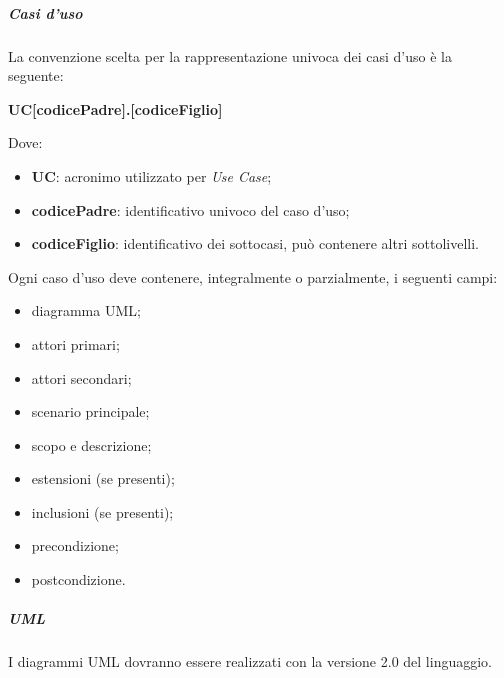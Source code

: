 				\subparagraph{Casi d'uso}
				La convenzione scelta per la rappresentazione univoca dei casi d'uso è la seguente:
				\begin{center}
					\textbf{UC[codicePadre].[codiceFiglio]}
				\end{center}					
				Dove:
				\begin{itemize}
					\item \textbf{UC}: acronimo utilizzato per \textit{Use Case};
					\item \textbf{codicePadre}: identificativo univoco del caso d'uso;
					\item \textbf{codiceFiglio}: identificativo dei sottocasi, può contenere altri sottolivelli.
				\end{itemize}
				Ogni caso d'uso deve contenere, integralmente o parzialmente, i seguenti campi:
				\begin{itemize}
					\item diagramma UML;
					\item attori primari;
					\item attori secondari;
					\item scenario principale;
					\item scopo e descrizione;
					\item estensioni (se presenti);
					\item inclusioni (se presenti);
					\item precondizione;
					\item postcondizione.
				\end{itemize}
				\subparagraph{UML}
				I diagrammi UML dovranno essere realizzati con la versione 2.0 del linguaggio.
